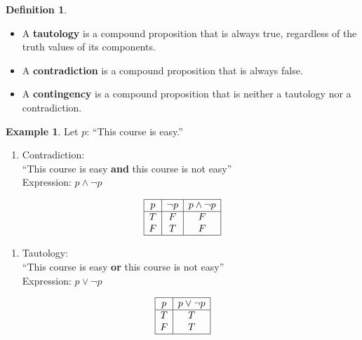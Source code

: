 \documentclass[
]{book}
\providecommand{\tightlist}{%
  \setlength{\itemsep}{0pt}\setlength{\parskip}{0pt}}
\theoremstyle{definition}
\newtheorem{definition}{Definition}[chapter]
\theoremstyle{definition}
\newtheorem{example}{Example}[chapter]
\theoremstyle{definition}
\theoremstyle{definition}
\theoremstyle{remark}
\begin{document}
\begin{definition}
\protect\hypertarget{def:unnamed-chunk-37}{}\label{def:unnamed-chunk-37}\leavevmode

\begin{itemize}
\tightlist
\item
  A \textbf{tautology} is a compound proposition that is always true, regardless of the truth values of its components.
\item
  A \textbf{contradiction} is a compound proposition that is always false.
\item
  A \textbf{contingency} is a compound proposition that is neither a tautology nor a contradiction.
\end{itemize}

\end{definition}

\begin{example}
\protect\hypertarget{exm:unnamed-chunk-38}{}\label{exm:unnamed-chunk-38}Let \(p\): ``This course is easy.''

\begin{enumerate}
\def\labelenumi{(\roman{enumi})}
\tightlist
\item
  Contradiction:\\
  ``This course is easy \textbf{and} this course is not easy''\\
  Expression: \(p \land \neg p\)
\end{enumerate}

\[
\begin{array}{|c|c|c|}
\hline
p & \neg p & p \land \neg p \\
\hline
T & F & F \\
F & T & F \\
\hline
\end{array}
\]

\begin{enumerate}
\def\labelenumi{(\roman{enumi})}
\setcounter{enumi}{1}
\tightlist
\item
  Tautology:\\
  ``This course is easy \textbf{or} this course is not easy''\\
  Expression: \(p \lor \neg p\)
\end{enumerate}

\[
\begin{array}{|c|c|}
\hline
p & p \lor \neg p \\
\hline
T & T \\
F & T \\
\hline
\end{array}
\]
\end{example}
\end{document}
